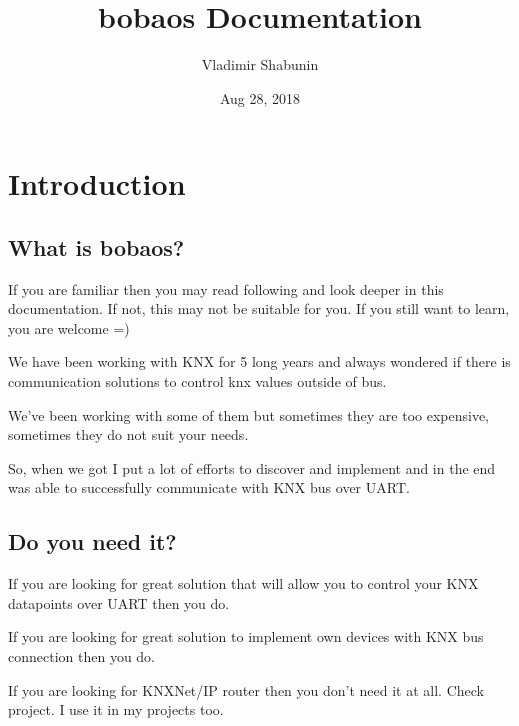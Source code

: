 \documentclass[letterpaper,10pt,english]{sphinxmanual}
\title{bobaos Documentation}
\date{Aug 28, 2018}
\author{Vladimir Shabunin}
\begin{document}
\maketitle
\sphinxtableofcontents
{}\label{\detokenize{index::doc}}



\chapter{Introduction}
\label{\detokenize{intro:introduction}}\label{\detokenize{intro:introduction}}\label{\detokenize{intro::doc}}

\section{What is bobaos?}
\label{\detokenize{intro:what-is-bobaos}}\label{\detokenize{intro:what-is-bobaos}}
If you are familiar  then you may read following and look deeper in this documentation. If not, this may not be suitable for you. If you still want to learn, you are welcome =)

We have been working with KNX for 5 long years and always wondered if there is communication solutions to control knx values outside of bus.

We’ve been working with some of them but sometimes they are too expensive, sometimes they do not suit your needs.

So, when we got  I put a lot of efforts to discover and implement  and in the end was able to successfully communicate with KNX bus over UART.


\section{Do you need it?}
\label{\detokenize{intro:do-you-need-it}}\label{\detokenize{intro:do-you-need-it}}
If you are looking for great solution that will allow you to control your KNX datapoints over UART then you do.

If you are looking for great solution to implement own devices with KNX bus connection then you do.

If you are looking for KNXNet/IP router then you don’t need it at all. Check  project. I use it in my projects too.
\end{document}
